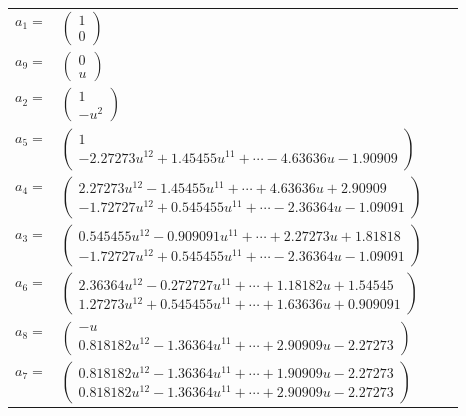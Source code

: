 \documentclass[1p]{elsarticle_modified}
\theoremstyle{definition}
\begin{document}
\begin{tabular}{m{7pt} m{180pt} m{7pt} m{180pt} }
\flushright $a_{1}=$&$\begin{pmatrix}1\\0\end{pmatrix}$ \\
\flushright $a_{9}=$&$\begin{pmatrix}0\\u\end{pmatrix}$ \\
\flushright $a_{2}=$&$\begin{pmatrix}1\\- u^2\end{pmatrix}$ \\
\flushright $a_{5}=$&$\begin{pmatrix}1\\-2.27273 u^{12}+1.45455 u^{11}+\cdots-4.63636 u-1.90909\end{pmatrix}$ \\
\flushright $a_{4}=$&$\begin{pmatrix}2.27273 u^{12}-1.45455 u^{11}+\cdots+4.63636 u+2.90909\\-1.72727 u^{12}+0.545455 u^{11}+\cdots-2.36364 u-1.09091\end{pmatrix}$ \\
\flushright $a_{3}=$&$\begin{pmatrix}0.545455 u^{12}-0.909091 u^{11}+\cdots+2.27273 u+1.81818\\-1.72727 u^{12}+0.545455 u^{11}+\cdots-2.36364 u-1.09091\end{pmatrix}$ \\
\flushright $a_{6}=$&$\begin{pmatrix}2.36364 u^{12}-0.272727 u^{11}+\cdots+1.18182 u+1.54545\\1.27273 u^{12}+0.545455 u^{11}+\cdots+1.63636 u+0.909091\end{pmatrix}$ \\
\flushright $a_{8}=$&$\begin{pmatrix}- u\\0.818182 u^{12}-1.36364 u^{11}+\cdots+2.90909 u-2.27273\end{pmatrix}$ \\
\flushright $a_{7}=$&$\begin{pmatrix}0.818182 u^{12}-1.36364 u^{11}+\cdots+1.90909 u-2.27273\\0.818182 u^{12}-1.36364 u^{11}+\cdots+2.90909 u-2.27273\end{pmatrix}$ \\

\end{tabular}
\end{document}

